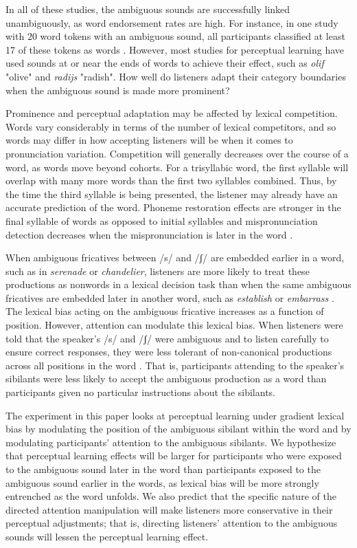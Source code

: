 \documentclass[a4paper,11pt,twocolumn]{article}
\begin{document}
In all of these studies, the ambiguous sounds are successfully linked unambiguously, as word endorsement rates are high.  For instance, in one study with 20 word tokens with an ambiguous sound, all participants classified at least 17 of these tokens as words \cite{Reinisch2013}. However, most studies for perceptual learning have used sounds at or near the ends of words to achieve their effect, such as \emph{olif} "olive" and \emph{radijs} "radish".  How well do listeners adapt their category boundaries when the ambiguous sound is made more prominent?

Prominence and perceptual adaptation may be affected by lexical competition. Words vary considerably in terms of the number of lexical competitors, and so words may differ in how accepting listeners will be when it comes to pronunciation variation. Competition will generally decreases over the course of a word, as words move beyond cohorts.  For a trisyllabic word, the first syllable will overlap with many more words than the first two syllables combined. Thus, by the time the third syllable is being presented, the listener may already have an accurate prediction of the word. Phoneme restoration effects are stronger in the final syllable of words as opposed to initial syllables \cite{Samuel1987} and mispronunciation detection decreases when the mispronunciation is later in the word \cite{Marslen-Wilson1978}. 

When ambiguous fricatives between /s/ and /ʃ/ are embedded earlier in a word, such as in \emph{serenade} or \emph{chandelier}, listeners are more likely to treat these productions as nonwords in a lexical decision task than when the same ambiguous fricatives are embedded later in another word, such as \emph{establish} or \emph{embarrass} \cite{Pitt2012}. The lexical bias acting on the ambiguous fricative increases as a function of position. However, attention can modulate this lexical bias. When listeners were told that the speaker's /s/ and /ʃ/ were ambiguous and to listen carefully to ensure correct responses, they were less tolerant of non-canonical productions across all positions in the word \cite{Pitt2012}.  That is, participants attending to the speaker's sibilants were less likely to accept the ambiguous production as a word than participants given no particular instructions about the sibilants.

The experiment in this paper looks at perceptual learning under gradient lexical bias by modulating the position of the ambiguous sibilant within the word and by modulating participants' attention to the ambiguous sibilants.  We hypothesize that perceptual learning effects will be larger for participants who were exposed to the ambiguous sound later in the word than participants exposed to the ambiguous sound earlier in the words, as lexical bias will be more strongly entrenched as the word unfolds. We also predict that the specific nature of the directed attention manipulation will make listeners more conservative in their perceptual adjustments; that is, directing listeners' attention to the ambiguous sounds will lessen the perceptual learning effect.
\end{document}
